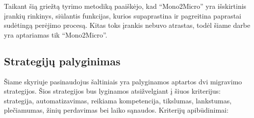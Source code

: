 \documentclass{VUMIFPSbakalaurinis}
\begin{document}
Taikant šią griežtą tyrimo metodiką paaiškėjo, kad \enquote{Mono2Micro} yra išskirtinis įrankių rinkinys, siūlantis funkcijas, kurios supaprastina ir pagreitina paprastai sudėtingą perėjimo procesą. Kitas toks įrankis nebuvo atrastas, todėl šiame darbe yra aptariamas tik \enquote{Mono2Micro}.

\subsection{Strategijų palyginimas}
Šiame skyriuje pasinaudojus šaltiniais yra palyginamos aptartos dvi migravimo strategijos. Šios strategijos bus lyginamos atsižvelgiant į šiuos kriterijus: strategija, automatizavimas, reikiama kompetencija, tikslumas, lankstumas, plečiamumas, žinių perdavimas bei laiko sąnaudos. Kriterijų apibūdinimai:
\end{document}
